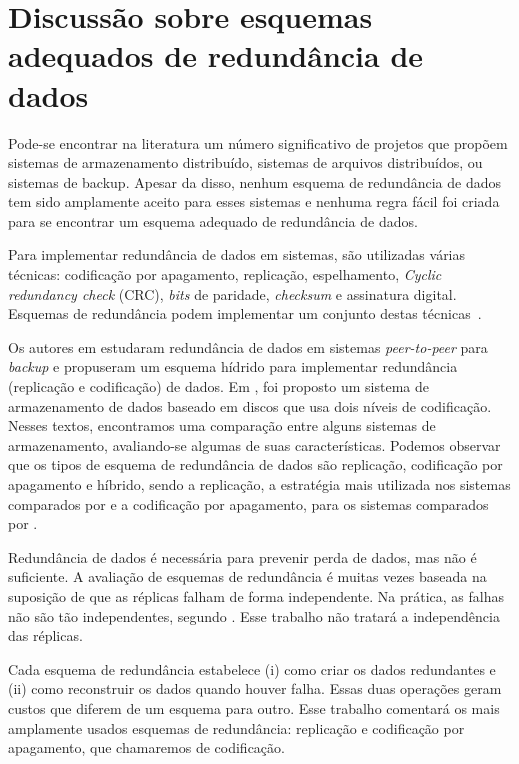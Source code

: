 \chapter{Discussão sobre esquemas adequados de redundância de dados}

Pode-se encontrar na literatura um número significativo de projetos que propõem sistemas de armazenamento distribuído, sistemas de arquivos distribuídos, ou sistemas de backup. Apesar da disso, nenhum esquema de redundância de dados tem sido amplamente aceito para esses sistemas e nenhuma regra fácil foi criada para se encontrar um esquema adequado de redundância de dados.

Para implementar redundância de dados em sistemas, são utilizadas
várias técnicas: codificação por apagamento, replicação, espelhamento,
\emph{Cyclic redundancy check} (CRC), \emph{bits} de paridade,
\emph{checksum} e assinatura digital. Esquemas de
redundância podem implementar um conjunto destas
técnicas~\cite{Fan:2009}.

Os autores em \cite{Duminoco:2009} estudaram redundância de dados em sistemas \emph{peer-to-peer} para \emph{backup} e propuseram um esquema hídrido para implementar redundância (replicação e codificação) de dados. Em \cite{Storer:2008}, foi proposto um sistema de armazenamento de dados baseado em discos que usa dois níveis de codificação. Nesses textos, encontramos uma comparação entre alguns sistemas de armazenamento, avaliando-se algumas de suas características. Podemos observar que os tipos de esquema de redundância de dados são replicação, codificação por apagamento e híbrido, sendo a replicação, a estratégia mais utilizada nos sistemas comparados por \cite{Duminoco:2009} e a codificação por apagamento, para os sistemas comparados por \cite{Storer:2008}.

Redundância de dados é necessária para prevenir perda de dados, mas não é suficiente. A avaliação de esquemas de redundância é muitas vezes baseada na suposição de que as réplicas falham de forma independente. Na prática, as falhas não são tão independentes, segundo \cite{Weatherspoon:2002:02,Baker:2006}. Esse trabalho não tratará a independência das réplicas.

Cada esquema de redundância estabelece (i) como criar os dados redundantes e (ii) como reconstruir os dados quando houver falha. Essas duas operações geram custos que diferem de um esquema para outro. Esse trabalho comentará os mais amplamente usados esquemas de redundância: replicação e codificação por apagamento, que chamaremos de codificação.

